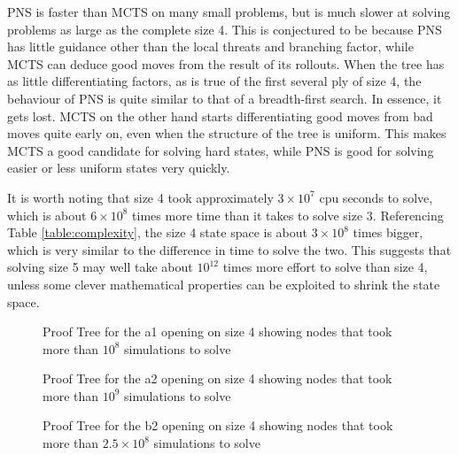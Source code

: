 PNS is faster than MCTS on many small problems, but is much slower at solving problems as large as the complete size 4. This is conjectured to be because PNS has little guidance other than the local threats and branching factor, while MCTS can deduce good moves from the result of its rollouts. When the tree has as little differentiating factors, as is true of the first several ply of size 4, the behaviour of PNS is quite similar to that of a breadth-first search. In essence, it gets lost. MCTS on the other hand starts differentiating good moves from bad moves quite early on, even when the structure of the tree is uniform. This makes MCTS a good candidate for solving hard states, while PNS is good for solving easier or less uniform states very quickly.

It is worth noting that size 4 took approximately $3 \times 10^7$ cpu seconds to solve, which is about $6 \times 10^8$ times more time than it takes to solve size 3. Referencing Table \ref{table:complexity}, the size 4 state space is about $3 \times 10^8$ times bigger, which is very similar to the difference in time to solve the two. This suggests that solving size 5 may well take about $10^{12}$ times more effort to solve than size 4, unless some clever mathematical properties can be exploited to shrink the state space. %

\begin{figure}
\centering

\caption[Proof Tree for the a1 Opening on Size 4]{Proof Tree for the a1 opening on size 4 showing nodes that took more than $10^8$ simulations to solve}
\label{fig:proof-a1}
\end{figure}

\begin{figure}
\centering

\caption[Proof Tree for the a2 Opening on Size 4]{Proof Tree for the a2 opening on size 4 showing nodes that took more than $10^9$ simulations to solve}
\label{fig:proof-a2}
\end{figure}

\begin{figure}
\centering

\caption[Proof Tree for the b2 Opening on Size 4]{Proof Tree for the b2 opening on size 4 showing nodes that took more than $2.5 \times 10^8$ simulations to solve}
\label{fig:proof-b2}
\end{figure}

